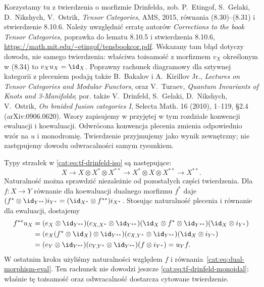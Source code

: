 Korzystamy tu z twierdzenia o morfizmie Drinfelda, zob. P.~Etingof, S.~Gelaki, D.~Nikshych, V.~Ostrik, \emph{Tensor Categories}, AMS, 2015, równania (8.30)--(8.31) i stwierdzenie 8.10.6. Należy uwzględnić erratę autorów \emph{Corrections to the book Tensor Categories}, poprawka do lematu 8.10.5 i stwierdzenia 8.10.6, \url{https://math.mit.edu/~etingof/tensbookcor.pdf}. Wskazany tam błąd dotyczy dowodu, nie samego twierdzenia: właściwa tożsamość z morfizmem $v_X$ określonym w (8.34) to $v_Xu_X=\id_X$. Poprawny rachunek diagramowy dla sztywnej kategorii z pleceniem podają także B.~Bakalov i A.~Kirillov Jr., \emph{Lectures on Tensor Categories and Modular Functors}, oraz V.~Turaev, \emph{Quantum Invariants of Knots and 3-Manifolds}; por. także V.~Drinfeld, S.~Gelaki, D.~Nikshych, V.~Ostrik, \emph{On braided fusion categories I}, Selecta Math. 16 (2010), 1--119, \S2.4 (arXiv:0906.0620). Wzory zapisujemy w przyjętej w tym rozdziale konwencji ewaluacji i koewaluacji. Odwrócona konwencja plecenia zmienia odpowiednio wzór na $u$ i monodromię. Twierdzenie przyjmujemy jako wynik zewnętrzny; nie zastępujemy dowodu odwracalności samym rysunkiem.

Typy strzałek w \eqref{cat:eq:tf-drinfeld-iso} są następujące:
\[
 X\longrightarrow X\otimes X^*\otimes X^{**}
 \longrightarrow X^*\otimes X\otimes X^{**}
 \longrightarrow X^{**}.
\]
Naturalność można sprawdzić niezależnie od pozostałych części twierdzenia. Dla $f:X\to Y$ równanie dla koewaluacji dualnego morfizmu $f^*$ daje
$(f^*\otimes\id_{Y^{**}})i_{Y^*}=(\id_{X^*}\otimes f^{**})i_{X^*}$.
Stosując naturalność plecenia i równanie dla ewaluacji, dostajemy
\[
\begin{aligned}
 f^{**}u_X
 &=(e_X\otimes\id_{Y^{**}})
 (c_{X,X^*}\otimes\id_{Y^{**}})
 (\id_X\otimes f^*\otimes\id_{Y^{**}})
 (\id_X\otimes i_{Y^*})\\
 &=(e_X(f^*\otimes\id_X)\otimes\id_{Y^{**}})
 (c_{X,Y^*}\otimes\id_{Y^{**}})
 (\id_X\otimes i_{Y^*})\\
 &=(e_Y\otimes\id_{Y^{**}})
 (c_{Y,Y^*}\otimes\id_{Y^{**}})
 (f\otimes i_{Y^*})=u_Yf.
\end{aligned}
\]
W ostatnim kroku użyliśmy naturalności względem $f$ i równania~\eqref{cat:eq:dual-morphism-eval}. Ten rachunek nie dowodzi jeszcze \eqref{cat:eq:tf-drinfeld-monoidal}; właśnie tę tożsamość oraz odwracalność dostarcza cytowane twierdzenie.


